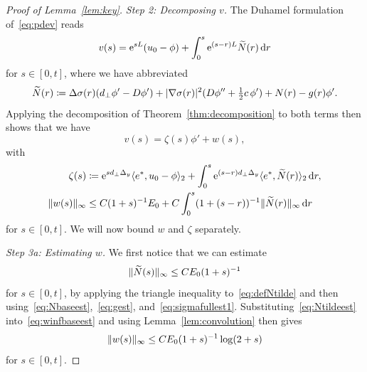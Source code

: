 \documentclass[12pt,oneside,a4paper,reqno]{amsart}
\numberwithin{equation}{section}
\theoremstyle{definition}
\theoremstyle{remark}
\newcommand{\rd}{{\,\rm{d}}}
\newcommand{\re}{{\rm e}}
\DeclarePairedDelimiter{\abs}{\lvert}{\rvert}
\DeclarePairedDelimiter{\norm}{\lVert}{\rVert}
\begin{document}
\begin{proof}[Proof of Lemma~\ref{lem:key}]
\emph{Step 2: Decomposing $v$.}
The Duhamel formulation of~\eqref{eq:pdev} reads
\begin{equation*}
    v(s) = \re^{sL}(u_0 - \phi) + \int_0^s \re^{(s - r)L} \widetilde{N}(r) \rd r
\end{equation*}
for $s \in [0,t]$, where we have abbreviated
\begin{equation}
    \label{eq:defNtilde}
    \widetilde{N}(r) \coloneq \Delta \sigma(r) (d_{\bot}\phi' - D\phi') + \abs{\nabla \sigma(r)}^2 (D \phi'' + \tfrac{1}{2}c\, \phi') + N(r) - g(r) \phi'.
\end{equation}
Applying the decomposition of Theorem~\ref{thm:decomposition} to both terms then shows that we have
\begin{equation}
    \label{eq:vdecomp}
    v(s) = \zeta(s) \phi' + w(s),
\end{equation}
with
\begin{subequations}
\label{eq:zetawdef}
\begin{align}
    \label{eq:defzeta}
    \zeta(s) &\coloneq \re^{sd_{\bot}\Delta_y} \langle e^*, u_0 - \phi\rangle_2+
    \int_0^s \re^{(s-r)d_{\bot}\Delta_y} \langle e^*,\widetilde{N}(r)\rangle_2 \rd r, \\
    \label{eq:winfbaseest}
    \norm{w(s)}_{\infty} &\leq C (1+s)^{-1}E_0 + C\int_0^s (1+(s-r))^{-1} \norm{\widetilde{N}(r)}_{\infty} \rd r
\end{align}
\end{subequations}
for $s \in [0,t]$. We will now bound $w$ and $\zeta$ separately.

\emph{Step 3a: Estimating $w$.}
We first notice that we can estimate
\begin{equation}
    \label{eq:Ntildeest}
    \norm{\widetilde{N}(s)}_{\infty} \leq C E_0 (1+s)^{-1}
\end{equation}
for $s \in [0,t]$, by applying the triangle inequality to~\eqref{eq:defNtilde} and then using~\eqref{eq:Nbaseest},~\eqref{eq:gest}, and~\eqref{eq:sigmafullest1}.
Substituting~\eqref{eq:Ntildeest} into~\eqref{eq:winfbaseest} and using Lemma~\ref{lem:convolution} then gives 
\begin{equation}
    \label{eq:west}
    \norm{w(s)}_{\infty} \leq C E_0 (1+s)^{-1}\log(2+s)
\end{equation}
for $s \in [0,t]$.


\end{proof}
\end{document}

